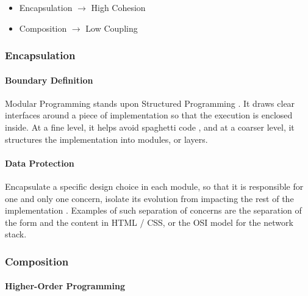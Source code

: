 \begin{itemize}
\item Encapsulation $\to$ High Cohesion
\item Composition $\to$ Low Coupling
\end{itemize}

\subsubsection{Encapsulation}

\paragraph{Boundary Definition}

Modular Programming stands upon Structured Programming \cite{Dijkstra1970}.
It draws clear interfaces around a piece of implementation so that the execution is enclosed inside.
At a fine level, it helps avoid spaghetti code \cite{Dijkstra1968a}, and at a coarser level, it structures the implementation \cite{Dijkstra1968} into modules, or layers.

\paragraph{Data Protection}

Encapsulate a specific design choice in each module, so that it is responsible for one and only one concern, isolate its evolution from impacting the rest of the implementation \cite{Parnas1972, Tarr1999, Hursch1995}.
Examples of such separation of concerns are the separation of the form and the content in HTML / CSS, or the OSI model for the network stack.

\subsubsection{Composition} \label{chapter3:software-maintainability:modularity:features}

\paragraph{Higher-Order Programming}

